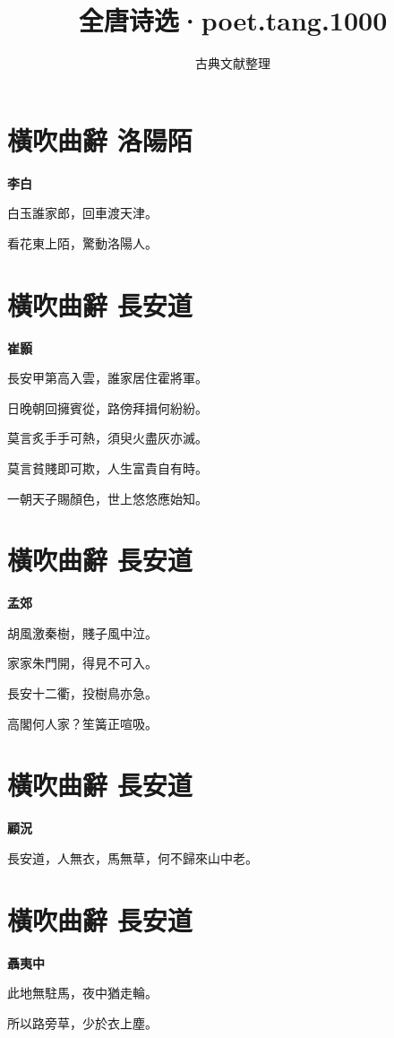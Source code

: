 \documentclass[12pt,a4paper]{ctexbook}
\title{全唐诗选·poet.tang.1000}
\author{古典文献整理}
\date{}
\begin{document}
\maketitle
\tableofcontents
\newpage
\section{橫吹曲辭 洛陽陌}
\textbf{李白}\par\vspace{0.5em}
白玉誰家郎，回車渡天津。\par
看花東上陌，驚動洛陽人。\par

\section{橫吹曲辭 長安道}
\textbf{崔顥}\par\vspace{0.5em}
長安甲第高入雲，誰家居住霍將軍。\par
日晚朝回擁賓從，路傍拜揖何紛紛。\par
莫言炙手手可熱，須臾火盡灰亦滅。\par
莫言貧賤即可欺，人生富貴自有時。\par
一朝天子賜顏色，世上悠悠應始知。\par

\section{橫吹曲辭 長安道}
\textbf{孟郊}\par\vspace{0.5em}
胡風激秦樹，賤子風中泣。\par
家家朱門開，得見不可入。\par
長安十二衢，投樹鳥亦急。\par
高閣何人家？笙簧正喧吸。\par

\section{橫吹曲辭 長安道}
\textbf{顧況}\par\vspace{0.5em}
長安道，人無衣，馬無草，何不歸來山中老。\par

\section{橫吹曲辭 長安道}
\textbf{聶夷中}\par\vspace{0.5em}
此地無駐馬，夜中猶走輪。\par
所以路旁草，少於衣上塵。\par
\end{document}
